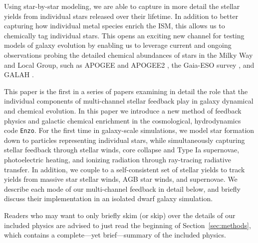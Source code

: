 \documentclass[twocolumn]{aastex61}
\begin{document}
Using star-by-star modeling, we are able to capture in more detail the stellar yields from individual stars released over their lifetime. In addition to better capturing how individual metal species enrich the ISM, this allows us to chemically tag individual stars. This opens an exciting new channel for testing models of galaxy evolution by enabling us to leverage current and ongoing observations probing the detailed chemical abundances of stars in the Milky Way and Local Group, such as APOGEE and APOGEE2 \citep{APOGEE2010,APOGEE}, the Gaia-ESO survey \citep{Gaia}, and GALAH \citep{GALAH}.

This paper is the first in a series of papers examining in detail the role that the individual components of multi-channel stellar feedback play in galaxy dynamical and chemical evolution. In this paper we introduce a new method of feedback physics and galactic chemical enrichment in the cosmological, hydrodynamics code \texttt{Enzo}. For the first time in galaxy-scale simulations, we model star formation down to particles representing individual stars, while simultaneously capturing stellar feedback through stellar winds, core collapse and Type Ia supernovae, photoelectric heating, and ionizing radiation through ray-tracing radiative transfer. In addition, we couple to a self-consistent set of stellar yields %
to track yields from massive star stellar winds, AGB star winds, and supernovae. We describe each mode of our multi-channel feedback 
in detail below, and briefly discuss their implementation in an isolated dwarf galaxy simulation.

Readers who may want to only briefly skim (or skip) over the details of our included physics are advised to just read the beginning of Section~\ref{sec:methods}, which contains a complete---yet brief---summary of the included physics.
\end{document}

